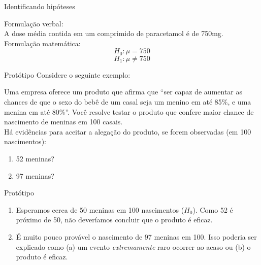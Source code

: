 \documentclass{beamer}
\begin{document}
\begin{frame}{Identificando hipóteses}
  \begin{example}
    Formulação verbal:\\
    A dose média contida em um comprimido de paracetamol é de 750mg.\\
    \bigskip
    Formulação matemática:\\
    \begin{displaymath}
      H_0: \mu = 750
    \end{displaymath}
    \begin{displaymath}
      H_1: \mu \ne 750
    \end{displaymath}
  \end{example}
\end{frame}


\begin{frame}{Protótipo}
  Considere o seguinte exemplo:
  \begin{example}
    Uma empresa oferece um produto que afirma que ``ser capaz de
    aumentar as chances de que o sexo do bebê de um casal seja um
    menino em até 85\%, e uma menina em até 80\%''. Você resolve
    testar o produto que
    confere maior chance de nascimento de meninas em 100 casais.\\
    \bigskip Há evidências para aceitar a alegação do produto, se
    forem observadas (em 100 nascimentos):
    \begin{enumerate}
    \item 52 meninas?
    \item 97 meninas?
    \end{enumerate}
  \end{example}
\end{frame}

\begin{frame}{Protótipo}
  \begin{example}
    \begin{enumerate}
    \item Esperamos cerca de 50 meninas em 100 nascimentos
      ($H_0$). Como 52 é próximo de 50, não deveríamos concluir que o
      produto é eficaz.
    \item É muito pouco provável o nascimento de 97 meninas em
      100. Isso poderia ser explicado como (a) um evento {\em
        extremamente} raro ocorrer ao acaso ou (b) o produto é eficaz.
    \end{enumerate}
  \end{example}
\end{frame}
\end{document}
